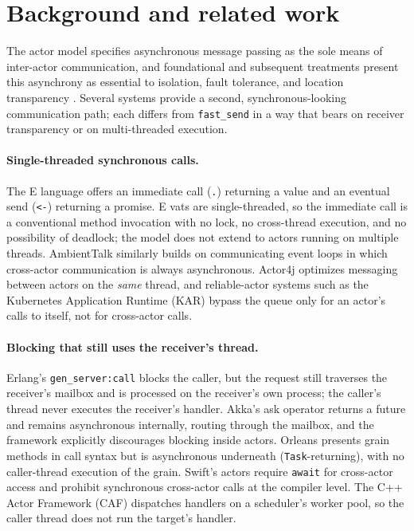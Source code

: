 \documentclass[11pt]{article}
\newcommand{\fs}{\texttt{fast\_send}}
\begin{document}
\section{Background and related work}
\label{sec:related}

The actor model \cite{hewitt1973,agha1986} specifies asynchronous message
passing as the sole means of inter-actor communication, and foundational and
subsequent treatments present this asynchrony as essential to isolation, fault
tolerance, and location transparency \cite{agha1986,sutter2005}. Several systems
provide a second, synchronous-looking communication path; each differs from \fs{}
in a way that bears on receiver transparency or on multi-threaded execution.

\paragraph{Single-threaded synchronous calls.} The E language
\cite{miller2005} offers an immediate call (\texttt{.}) returning a value and an
eventual send (\texttt{<-}) returning a promise. E vats are single-threaded, so
the immediate call is a conventional method invocation with no lock, no
cross-thread execution, and no possibility of deadlock; the model does not
extend to actors running on multiple threads. AmbientTalk \cite{ambienttalk2007}
similarly builds on communicating event loops in which cross-actor communication
is always asynchronous. Actor4j \cite{actor4j2018} optimizes messaging between
actors on the \emph{same} thread, and reliable-actor systems such as the
Kubernetes Application Runtime (KAR)
\cite{kar2021} bypass the queue only for an actor's calls to itself, not for
cross-actor calls.

\paragraph{Blocking that still uses the receiver's thread.} Erlang's
\texttt{gen\_server:call} \cite{armstrong1996} blocks the caller, but the
request still traverses the receiver's mailbox and is processed on the
receiver's own process; the caller's thread never executes the receiver's
handler. Akka's ask operator \cite{akka} returns a future and remains
asynchronous internally, routing through the mailbox, and the framework
explicitly discourages blocking inside actors. Orleans \cite{orleans} presents
grain methods in call syntax but is asynchronous underneath
(\texttt{Task}-returning), with no caller-thread execution of the grain. Swift's
actors \cite{swift2021} require \texttt{await} for cross-actor access and
prohibit synchronous cross-actor calls at the compiler level. 
The C++ Actor Framework (CAF) \cite{caf2014} dispatches handlers on a scheduler's worker pool, so the
caller thread does not run the target's handler.
\end{document}
